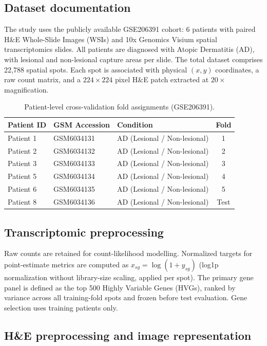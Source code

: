 \documentclass[nocrop]{bioinfo}
\begin{document}
\subsection{Dataset documentation}

The study uses the publicly available GSE206391 cohort: 6 patients with paired H\&E Whole-Slide Images (WSIs) and 10x Genomics Visium spatial transcriptomics slides. All patients are diagnosed with Atopic Dermatitis (AD), with lesional and non-lesional capture areas per slide. The total dataset comprises 22,788 spatial spots. Each spot is associated with physical $(x, y)$ coordinates, a raw count matrix, and a $224 \times 224$ pixel H\&E patch extracted at $20\times$ magnification.

\begin{table}[h]
\centering
\caption{Patient-level cross-validation fold assignments (GSE206391).}
\label{tab:splits}
\begin{tabular}{lllc}
\hline
\textbf{Patient ID} & \textbf{GSM Accession} & \textbf{Condition} & \textbf{Fold} \\
\hline
Patient 1 & GSM6034131 & AD (Lesional / Non-lesional) & 1 \\
Patient 2 & GSM6034132 & AD (Lesional / Non-lesional) & 2 \\
Patient 3 & GSM6034133 & AD (Lesional / Non-lesional) & 3 \\
Patient 5 & GSM6034134 & AD (Lesional / Non-lesional) & 4 \\
Patient 6 & GSM6034135 & AD (Lesional / Non-lesional) & 5 \\
Patient 8 & GSM6034136 & AD (Lesional / Non-lesional) & Test \\
\hline
\end{tabular}
\end{table}

\subsection{Transcriptomic preprocessing}

Raw counts are retained for count-likelihood modelling. Normalized targets for
point-estimate metrics are computed as $x_{sg} = \log(1 + y_{sg})$ (log1p
normalization without library-size scaling, applied per spot). The primary
gene panel is defined as the top 500 Highly Variable Genes (HVGs), ranked by
variance across all training-fold spots and frozen before test evaluation.
Gene selection uses training patients only.

\subsection{H\&E preprocessing and image representation}
\end{document}
